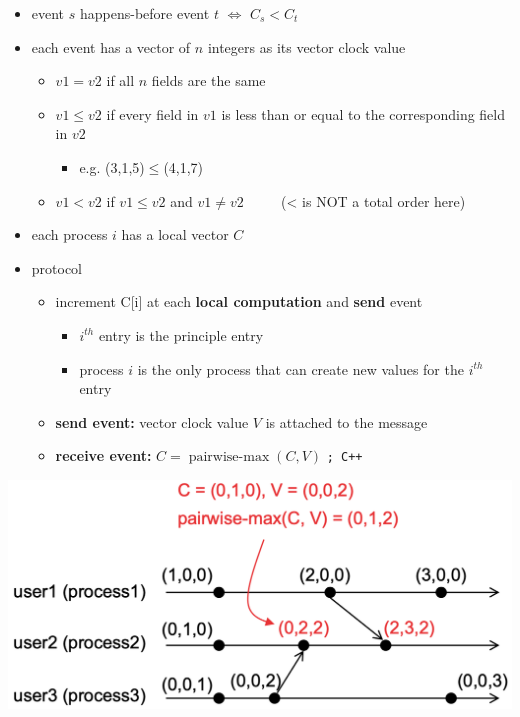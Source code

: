 \documentclass[10pt, landscape]{article}
\DeclareMathOperator{\pairwisemax}{pairwise-max}
\begin{document}
\begin{multicols*}{3}
  \begin{itemize}
    \item event $s$ happens-before event $t$ $\iff$ $C_s < C_t$
    \item  each event has a vector of $n$ integers as its vector clock value
      \begin{itemize}
        \item $v1=v2$ if all $n$ fields are the same
        \item $v1 \leq v2$ if every field in $v1$ is less than or equal to the corresponding field in $v2$
          \begin{itemize}
            \item e.g. (3,1,5)$\leq$(4,1,7)
          \end{itemize}
        \item $v1<v2$ if $v1 \leq v2$ and $v1 \neq v2$ $\quad\quad$ (< is NOT a total order here)
      \end{itemize}
    \item each process $i$ has a local vector $C$
    \item protocol
      \begin{itemize}
        \item increment C[i] at each \textbf{local computation} and \textbf{send} event
          \begin{itemize}
            \item $i^{th}$ entry is the principle entry
            \item process $i$ is the only process that can create new values for the $i^{th}$ entry
          \end{itemize}
        \item \textbf{send event:} vector clock value $V$ is attached to the message
        \item \textbf{receive event:} $C= \pairwisemax(C,V)$ \texttt{; C++}
      \end{itemize}
  \end{itemize}

  \begin{tightcenter}
    \includegraphics[width=0.5\linewidth]{cs4231-vector-clocks.png} 
  \end{tightcenter}


\end{multicols*}
\end{document}
